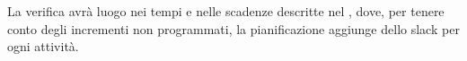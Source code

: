 La verifica avrà luogo nei tempi e nelle scadenze descritte nel \PdP , dove, per tenere conto degli incrementi non programmati, la pianificazione aggiunge dello {slack} per ogni attività.